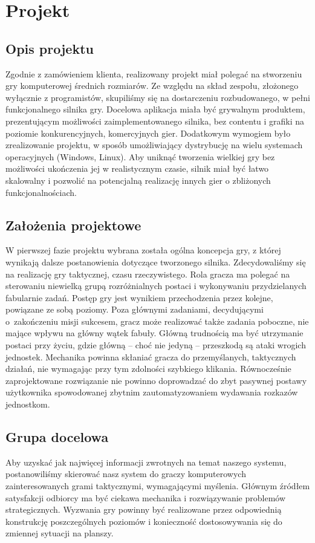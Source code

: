 \documentclass[licencjacka]{pracamgr}
\begin{document}
\chapter{Projekt}

  \section{Opis projektu}
    Zgodnie z zamówieniem klienta, realizowany projekt miał polegać na stworzeniu gry komputerowej
    średnich rozmiarów. Ze względu na skład zespołu, złożonego wyłącznie z programistów, skupiliśmy się
    na dostarczeniu rozbudowanego, w pełni funkcjonalnego silnika gry.
    Docelowa aplikacja miała być grywalnym produktem, prezentującym możliwości zaimplementowanego silnika,
    bez contentu i grafiki na poziomie konkurencyjnych, komercyjnych gier. Dodatkowym wymogiem było zrealizowanie
    projektu, w sposób umożliwiający dystrybucję na wielu systemach operacyjnych (Windows, Linux). Aby uniknąć
    tworzenia wielkiej gry bez możliwości ukończenia jej w realistycznym czasie, silnik miał być łatwo skalowalny
    i pozwolić na potencjalną realizację innych gier o zbliżonych funkcjonalnościach.

  \section{Założenia projektowe}
    W pierwszej fazie projektu wybrana została ogólna koncepcja gry, z której wynikają dalsze postanowienia dotyczące
    tworzonego silnika. Zdecydowaliśmy się na realizację gry taktycznej, czasu rzeczywistego. Rola gracza ma polegać
    na sterowaniu niewielką grupą rozróżnialnych postaci i wykonywaniu przydzielanych fabularnie zadań. Postęp gry jest 
    wynikiem przechodzenia przez kolejne, powiązane ze sobą poziomy. Poza głównymi zadaniami, decydującymi o~zakończeniu
    misji sukcesem, gracz może realizować także zadania poboczne, nie mające wpływu na główny wątek fabuły. Główną
    trudnością ma być utrzymanie postaci przy życiu, gdzie główną -- choć nie jedyną -- przeszkodą są ataki wrogich jednostek.
    Mechanika powinna skłaniać gracza do przemyślanych, taktycznych działań, nie wymagając przy tym zdolności szybkiego klikania. 
    Równocześnie zaprojektowane rozwiązanie nie powinno doprowadzać do zbyt pasywnej postawy użytkownika spowodowanej zbytnim
    zautomatyzowaniem wydawania rozkazów jednostkom.

  \section{Grupa docelowa}
    Aby uzyskać jak najwięcej informacji zwrotnych na temat naszego systemu, postanowiliśmy skierować nasz system do
    graczy komputerowych zainteresowanych grami taktycznymi, wymagającymi myślenia. Głównym źródłem satysfakcji
    odbiorcy ma być ciekawa mechanika i rozwiązywanie problemów strategicznych. Wyzwania gry powinny być realizowane przez
    odpowiednią konstrukcję poszczególnych poziomów i konieczność dostosowywania się do zmiennej sytuacji na planszy.
\end{document}
